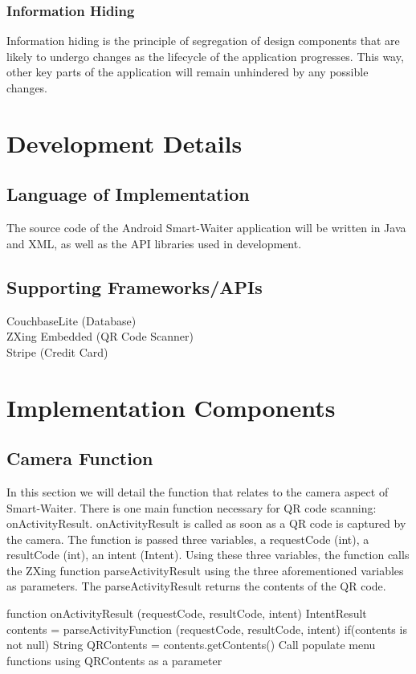 \documentclass[12pt, titlepage]{article}
\begin{document}
\subsubsection{Information Hiding}
Information hiding is the principle of segregation of design components that are likely to undergo changes as the lifecycle of the application progresses. This way, other key parts of the application will remain unhindered by any possible changes.

\section{Development Details}
\subsection{Language of Implementation}
The source code of the Android Smart-Waiter application will be written in Java and XML, as well as the API libraries used in development. 

\subsection{Supporting Frameworks/APIs}
CouchbaseLite (Database)\\
ZXing Embedded (QR Code Scanner)\\
Stripe (Credit Card)

\section{Implementation Components}
\subsection{Camera Function}
In this section we will detail the function that relates to the camera aspect of Smart-Waiter. There is one main function necessary for QR code scanning: onActivityResult. onActivityResult is called as soon as a QR code is captured by the camera. The function is passed three variables, a requestCode (int), a resultCode (int), an intent (Intent). Using these three variables, the function calls the ZXing function parseActivityResult using the three aforementioned variables as parameters. The parseActivityResult returns the contents of the QR code. 
 

function onActivityResult (requestCode, resultCode, intent)
	IntentResult contents = parseActivityFunction (requestCode, resultCode, intent)
	if(contents is not null)
		String QRContents = contents.getContents()
		Call populate menu functions using QRContents as a parameter
		
\end{document}
